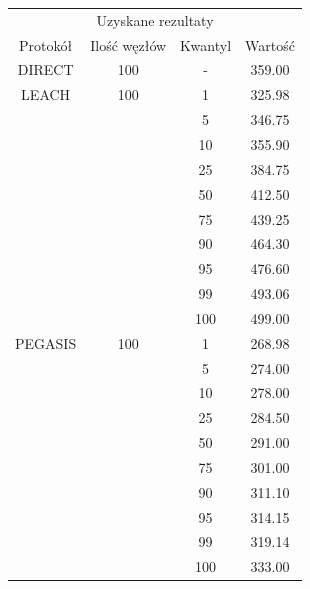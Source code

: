 \documentclass[a4paper,12pt,twoside,openany]{report}
\begin{document}
\begin{longtable}{*{4}{c}}
\toprule
\multicolumn{4}{c}{Uzyskane rezultaty} \\
Protokół	& Ilość węzłów	& Kwantyl	& Wartość \\
\midrule
\endhead
DIRECT	& 100 	& -	& 359.00 \\*
\midrule
LEACH	& 100	& 1	& 325.98 \\*
	&	& 5	& 346.75 \\*
	&	& 10	& 355.90 \\*
	&	& 25	& 384.75 \\*
	&	& 50	& 412.50 \\*
	&	& 75	& 439.25 \\*
	&	& 90	& 464.30 \\*
	&	& 95	& 476.60 \\*
	&	& 99	& 493.06 \\*
	&	& 100	& 499.00 \\*
\midrule
PEGASIS	& 100	& 1	& 268.98 \\*
	&	& 5	& 274.00 \\*
	&	& 10	& 278.00 \\*
	&	& 25	& 284.50 \\*
	&	& 50	& 291.00 \\*
	&	& 75	& 301.00 \\*
	&	& 90	& 311.10 \\*
	&	& 95	& 314.15 \\*
	&	& 99	& 319.14 \\*
	&	& 100	& 333.00 \\*
\bottomrule
\end{longtable}
\end{document}

